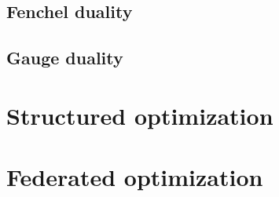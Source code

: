 \subsection{Fenchel duality}

\subsection{Gauge duality}

\section{Structured optimization}

\section{Federated optimization}
